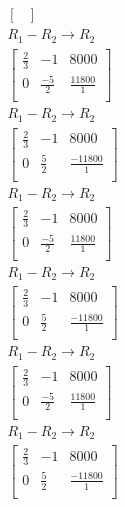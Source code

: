 \documentclass[12pt letter]{report}
\begin{document}
{\begin{align*}
\begin{bmatrix}
    \end{bmatrix}
    \\
    R_1 - R_2  \rightarrow R_2            \\
    \begin{bmatrix}
      \frac{2}{3} & -1           & 8000            \\
      0           & \frac{-5}{2} & \frac{11800}{1} \\
    \end{bmatrix}
    \\
    R_1 - R_2  \rightarrow R_2            \\
    \begin{bmatrix}
      \frac{2}{3} & -1          & 8000             \\
      0           & \frac{5}{2} & \frac{-11800}{1} \\
    \end{bmatrix}
    \\
    R_1 - R_2  \rightarrow R_2            \\
    \begin{bmatrix}
      \frac{2}{3} & -1           & 8000            \\
      0           & \frac{-5}{2} & \frac{11800}{1} \\
    \end{bmatrix}
    \\
    R_1 - R_2  \rightarrow R_2            \\
    \begin{bmatrix}
      \frac{2}{3} & -1          & 8000             \\
      0           & \frac{5}{2} & \frac{-11800}{1} \\
    \end{bmatrix}
    \\
    R_1 - R_2  \rightarrow R_2            \\
    \begin{bmatrix}
      \frac{2}{3} & -1           & 8000            \\
      0           & \frac{-5}{2} & \frac{11800}{1} \\
    \end{bmatrix}
    \\
    R_1 - R_2  \rightarrow R_2            \\
    \begin{bmatrix}
      \frac{2}{3} & -1          & 8000             \\
      0           & \frac{5}{2} & \frac{-11800}{1} \\

\end{bmatrix}
\end{align*}}
\end{document}
